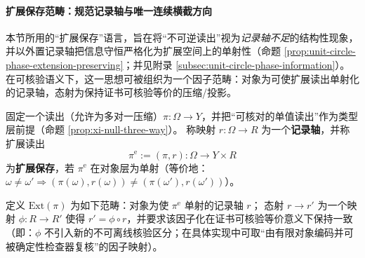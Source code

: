 \paragraph{扩展保存范畴：规范记录轴与唯一连续横截方向}
本节所用的“扩展保存”语言，旨在将“不可逆读出”视为\emph{记录轴不足}的结构性现象，并以外置记录轴把信息守恒严格化为扩展空间上的单射性（命题 \ref{prop:unit-circle-phase-extension-preserving}；并见附录 \ref{subsec:unit-circle-phase-information}）。
在可核验语义下，这一思想可被组织为一个因子范畴：对象为可使扩展读出单射化的记录轴，态射为保持证书可核验等价的压缩/投影。

\begin{definition}[扩展保存范畴与因子态射]\label{def:xi-extension-preserving-category}
固定一个读出（允许为多对一压缩）\(\pi:\Omega\to Y\)，并把“可核对的单值读出”作为类型层前提（命题 \ref{prop:xi-null-three-way}）。
称映射 \(r:\Omega\to R\) 为一个\textbf{记录轴}，并称扩展读出
\[
\pi^{\mathrm e}:=(\pi,r):\Omega\to Y\times R
\]
为\textbf{扩展保存}，若 \(\pi^{\mathrm e}\) 在对象层为单射（等价地：\(\omega\neq\omega'\Rightarrow (\pi(\omega),r(\omega))\neq(\pi(\omega'),r(\omega'))\)）。
\par
定义 \(\mathrm{Ext}(\pi)\) 为如下范畴：对象为使 \(\pi^{\mathrm e}\) 单射的记录轴 \(r\)；
态射 \(r\to r'\) 为一个映射 \(\phi:R\to R'\) 使得 \(r'=\phi\circ r\)，并要求该因子化在证书可核验等价意义下保持一致（即：\(\phi\) 不引入新的不可离线核验区分；在具体实现中可取“由有限对象编码并可被确定性检查器复核”的因子映射）。
\end{definition}

